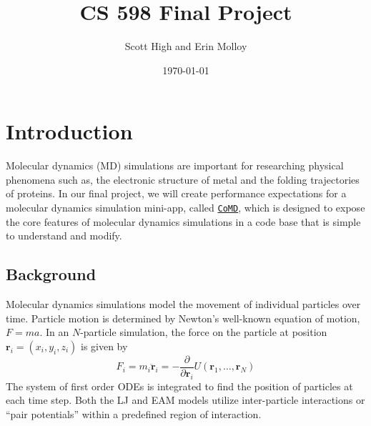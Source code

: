\documentclass[12pt]{article}
\title{CS 598 Final Project}
\author{Scott High and Erin Molloy}
\date{\today}
\begin{document}
\maketitle

\section{Introduction}
Molecular dynamics (MD) simulations are important for researching physical phenomena 
such as, the electronic structure of metal and the folding trajectories of proteins. 
In our final project, we will create performance expectations for a molecular dynamics 
simulation mini-app, called \href{https://github.com/exmatex/CoMD}{\texttt{CoMD}}, which is designed to expose the core features 
of molecular dynamics simulations in a code base that is simple to understand and modify.



\subsection{Background}
Molecular dynamics simulations model the movement of individual particles over time. 
Particle motion is determined by Newton's well-known equation of motion, $F = ma$. 
In an $N$-particle simulation, the force on the particle at position 
$\bm{r}_i = (x_i, y_i, z_i)$ is given by
\begin{equation*}
    F_i = m_i \ddot{\bm{r}}_i = -\frac{\partial}{\partial \bm{r}_i} U(\bm{r}_1, \dots, \bm{r}_N)
\end{equation*}
The system of first order ODEs is integrated to find the position of particles at each time step.
Both the LJ and EAM models utilize inter-particle interactions or ``pair potentials''
within a predefined region of interaction.
\end{document}
